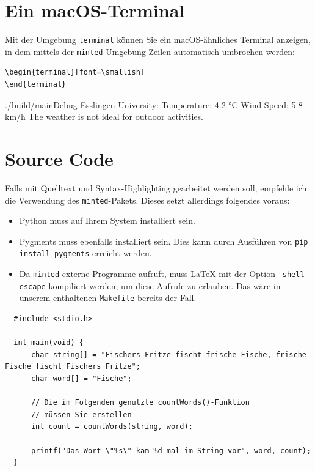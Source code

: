 \section{Ein macOS-Terminal}

Mit der Umgebung \texttt{terminal} können Sie ein macOS-ähnliches Terminal
anzeigen, in dem mittels der \texttt{minted}-Umgebung Zeilen automatisch
umbrochen werden:

\begin{verbatim}
\begin{terminal}[font=\smallish]
\end{terminal}
\end{verbatim}

\begin{terminal}[font=\smallish]
./build/mainDebug
Esslingen University:
Temperature: 4.2 °C
Wind Speed: 5.8 km/h
The weather is not ideal for outdoor activities.
\end{terminal}

\section{Source Code}

Falls mit Quelltext und Syntax-Highlighting gearbeitet werden soll, empfehle ich
die Verwendung des \texttt{minted}-Pakets. Dieses setzt allerdings folgendes
voraus:

\begin{itemize}
  \item Python muss auf Ihrem System installiert sein.
  \item Pygments muss ebenfalls installiert sein. Dies kann durch Ausführen von
  \texttt{pip install pygments} erreicht werden.
  \item Da \texttt{minted} externe Programme aufruft, muss LaTeX mit der Option
  \texttt{-shell-escape} kompiliert werden, um diese Aufrufe zu erlauben. Das
  wäre in unserem enthaltenen \texttt{Makefile} bereits der Fall.
\end{itemize}

\begin{verbatim}
  #include <stdio.h>
  
  int main(void) {
      char string[] = "Fischers Fritze fischt frische Fische, frische Fische fischt Fischers Fritze";
      char word[] = "Fische";
  
      // Die im Folgenden genutzte countWords()-Funktion
      // müssen Sie erstellen
      int count = countWords(string, word);
  
      printf("Das Wort \"%s\" kam %d-mal im String vor", word, count);
  }
\end{verbatim}

